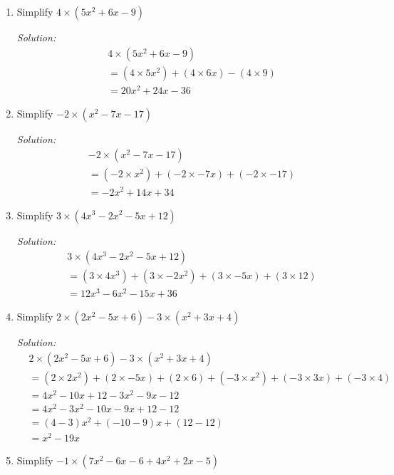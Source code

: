 \documentclass[16pt]{article}
\theoremstyle{remark}
\begin{document}
\begin{enumerate}
\item Simplify $\displaystyle{4\times(5x^2+6x-9)}$
\begin{mdframed}[style=TheoremFrame]
\textit{Solution:}
\begin{align*}
&4\times(5x^2+6x-9)\\
&=(4\times 5x^2)+(4\times 6x) - (4\times 9)\\
&= 20x^2 + 24x - 36
\end{align*}
\end{mdframed}
\item Simplify $\displaystyle{-2\times(x^2-7x-17)}$
\begin{mdframed}[style=TheoremFrame]
\textit{Solution:}
\begin{align*}
&-2\times(x^2-7x-17)\\
&= (-2\times x^2) + (-2\times -7x) + (-2 \times -17)\\
&= -2x^2 + 14x + 34
\end{align*}
\end{mdframed}
\item Simplify $\displaystyle{3\times(4x^3-2x^2-5x+12)}$
\begin{mdframed}[style=TheoremFrame]
\textit{Solution:}
\begin{align*}
&3\times(4x^3-2x^2-5x+12)\\
&= (3\times 4x^3) + (3\times -2x^2) + (3 \times -5x) + (3\times 12)\\
&= 12x^3 -6x^2 -15x+36
\end{align*}
\end{mdframed}
\newpage
\item Simplify $\displaystyle{2\times(2x^2-5x+6)-3\times(x^2+3x+4)}$
\begin{mdframed}[style=TheoremFrame]
\textit{Solution:}
\begin{align*}
&2\times(2x^2-5x+6)-3\times(x^2+3x+4)\\
&= (2\times 2x^2) + (2\times -5x) + (2\times 6) + (-3\times x^2) + (-3 \times 3x) + (-3\times 4)\\
&= 4x^2 -10x + 12 -3x^2 - 9x - 12\\
&= 4x^2 - 3x^2 -10x - 9x + 12 - 12\\
&= (4-3)x^2 + (-10-9)x + (12-12)\\
&= x^2 - 19x
\end{align*}
\end{mdframed}
\item Simplify $\displaystyle{-1\times(7x^2-6x-6+4x^2+2x-5)}$
\begin{mdframed}[style=TheoremFrame]

\end{mdframed}
\end{enumerate}
\end{document}
